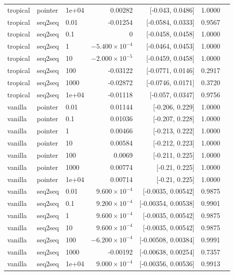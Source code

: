 \documentclass[10pt]{article}
\begin{document}
{\begin{longtable}{lllrrrl}
tropical & pointer & 1e+04 & 0.00282 & [-0.043, 0.0486] & 1.0000 & \\
tropical & seq2seq & 0.01 & -0.01254 & [-0.0584, 0.0333] & 0.9567 & \\
tropical & seq2seq & 0.1 & 0 & [-0.0458, 0.0458] & 1.0000 & \\
tropical & seq2seq & 1 & $-5.400\times10^{-4}$ & [-0.0464, 0.0453] & 1.0000 & \\
tropical & seq2seq & 10 & $-2.000\times10^{-5}$ & [-0.0459, 0.0458] & 1.0000 & \\
tropical & seq2seq & 100 & -0.03122 & [-0.0771, 0.0146] & 0.2917 & \\
tropical & seq2seq & 1000 & -0.02872 & [-0.0746, 0.0171] & 0.3720 & \\
tropical & seq2seq & 1e+04 & -0.01118 & [-0.057, 0.0347] & 0.9756 & \\
vanilla & pointer & 0.01 & 0.01144 & [-0.206, 0.229] & 1.0000 & \\
vanilla & pointer & 0.1 & 0.01036 & [-0.207, 0.228] & 1.0000 & \\
vanilla & pointer & 1 & 0.00466 & [-0.213, 0.222] & 1.0000 & \\
vanilla & pointer & 10 & 0.00584 & [-0.212, 0.223] & 1.0000 & \\
vanilla & pointer & 100 & 0.0069 & [-0.211, 0.225] & 1.0000 & \\
vanilla & pointer & 1000 & 0.00774 & [-0.21, 0.225] & 1.0000 & \\
vanilla & pointer & 1e+04 & 0.00714 & [-0.21, 0.225] & 1.0000 & \\
vanilla & seq2seq & 0.01 & $9.600\times10^{-4}$ & [-0.0035, 0.00542] & 0.9875 & \\
vanilla & seq2seq & 0.1 & $9.200\times10^{-4}$ & [-0.00354, 0.00538] & 0.9901 & \\
vanilla & seq2seq & 1 & $9.600\times10^{-4}$ & [-0.0035, 0.00542] & 0.9875 & \\
vanilla & seq2seq & 10 & $9.600\times10^{-4}$ & [-0.0035, 0.00542] & 0.9875 & \\
vanilla & seq2seq & 100 & $-6.200\times10^{-4}$ & [-0.00508, 0.00384] & 0.9991 & \\
vanilla & seq2seq & 1000 & -0.00192 & [-0.00638, 0.00254] & 0.7357 & \\
vanilla & seq2seq & 1e+04 & $9.000\times10^{-4}$ & [-0.00356, 0.00536] & 0.9913 & \\
\bottomrule
\end{longtable}
}
\end{document}
